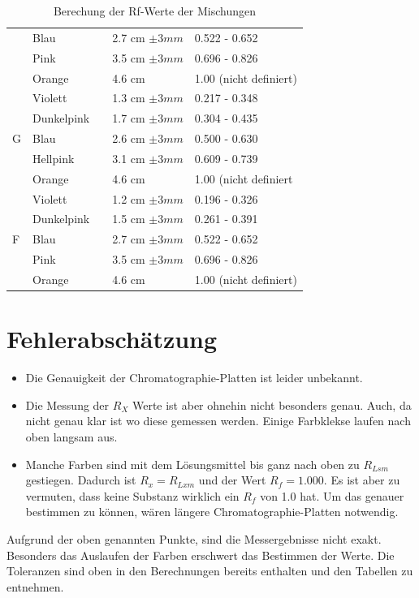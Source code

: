 \documentclass[11pt,paper=a4,final]{scrartcl}
\begin{document}
\begin{savenotes}
\begin{table}[ht!]
\begin{tabular}{|l|l|l|l|l|}
      			& Blau		& 				& 2.7 cm \(\pm 3 mm \)	& 0.522 - 0.652		\\
      			& Pink		&				& 3.5 cm \(\pm 3 mm \)	& 0.696 - 0.826		\\
			& Orange	&				& 4.6 cm 		& 1.00 (nicht definiert)\\ \cline{1-2} \cline{4-5}
      \multirow{5}{*}{G}
			& Violett	&				& 1.3 cm \(\pm 3 mm \)	& 0.217 - 0.348		\\
      			& Dunkelpink 	&				& 1.7 cm \(\pm 3 mm \)	& 0.304 - 0.435		\\
			& Blau		&				& 2.6 cm \(\pm 3 mm \)	& 0.500 - 0.630		\\
      			& Hellpink	& 				& 3.1 cm \(\pm 3 mm \)	& 0.609 - 0.739		\\
      			& Orange	&				& 4.6 cm		& 1.00 (nicht definiert \\ \cline{1-2} \cline{4-5}
      \multirow{5}{*}{F}
			& Violett	&				& 1.2 cm \(\pm 3 mm \)	& 0.196 - 0.326		\\
      			& Dunkelpink 	&				& 1.5 cm \(\pm 3 mm \)	& 0.261 - 0.391		\\
      			& Blau		& 				& 2.7 cm \(\pm 3 mm \)	& 0.522 - 0.652		\\
      			& Pink		&				& 3.5 cm \(\pm 3 mm \)	& 0.696 - 0.826		\\
			& Orange	&				& 4.6 cm 		& 1.00 (nicht definiert)\\ \hline

    \end{tabular}
    \caption{Berechung der Rf-Werte der Mischungen}
  \end{table}
\end{savenotes}

\section{Fehlerabsch\"atzung}
\begin{itemize}
  \item Die Genauigkeit der Chromatographie-Platten ist leider unbekannt.
  \item Die Messung der \( R_X \) Werte ist aber ohnehin nicht besonders genau. Auch, da nicht genau klar ist wo diese gemessen werden. Einige Farbklekse laufen nach oben langsam aus.
  \item Manche Farben sind mit dem L\"osungsmittel bis ganz nach oben zu \(R_{Lsm}\) gestiegen. Dadurch ist \(R_x = R_{Lxm} \) und der Wert \(R_f = 1.000\). Es ist aber zu vermuten, dass keine Substanz wirklich ein \(R_f\) von 1.0 hat. Um das genauer bestimmen zu k\"onnen, w\"aren l\"angere Chromatographie-Platten notwendig.
\end{itemize}
Aufgrund der oben genannten Punkte, sind die Messergebnisse nicht exakt. Besonders das Auslaufen der Farben erschwert das Bestimmen der Werte. Die Toleranzen sind oben in den Berechnungen bereits enthalten und den Tabellen zu entnehmen.
\end{document}

